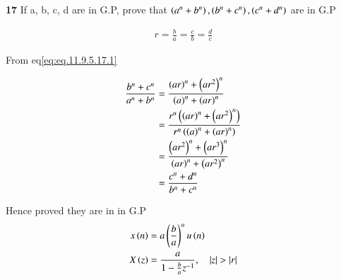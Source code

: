 \documentclass[journal,12pt,twocolumn]{IEEEtran}
\theoremstyle{remark}
\begin{document}


\vspace{3cm}

\title{}
\author{EE23BTECH11047 - Deepakreddy P
}
\maketitle
\newpage
\bigskip

\noindent \textbf{17} \quad 
If a, b, c, d are in G.P, prove that 
$ \left(a^{n} + b^{n}\right),\left(b^{n} + c^{n}\right),\left(c^{n} + d^{n}\right) $ are in G.P \\
\solution

\begin{center}
    \begin{table}[ht]
        
    \end{table}
\end{center}


\begin{align}   
r=\frac{b}{a} = \frac{c}{b}= \frac{d}{c} \label{eq:eq.11.9.5.17.1}
\end{align}

From eq\eqref{eq:eq.11.9.5.17.1}

\begin{align}
\frac{b^n + c^n}{a^n + b^n}
&= \frac{\left(ar\right)^n + \left(ar^2\right)^n}{\left(a\right)^n + \left(ar\right)^n}\\
&= \frac{r^n \left(\left(ar\right)^n + \left(ar^2\right)^n\right)}{r^n \left(\left(a\right)^n + \left(ar\right)^n\right)}\\
&= \frac{\left(ar^2\right)^n + \left(ar^3\right)^n}{\left(ar\right)^n + \left(ar^2\right)^n}\\
&= \frac{c^n + d^n}{b^n + c^n}
\end{align}

Hence proved they are in in G.P\\

\begin{align}
    x\brak{n} &= a\brak{\frac{b}{a}}^{n} u\brak{n}\\
    X\brak{z} &= \frac{a}{1-\frac{b}{a} z^{-1}}, \quad |z|>|r|
\end{align}
\end{document}
